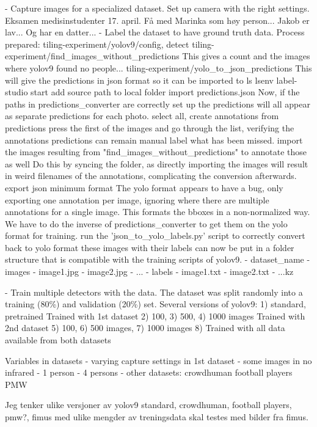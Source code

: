 - Capture images for a specialized dataset.
	Set up camera with the right settings.
	Eksamen medisinstudenter 17. april.
		Få med Marinka som høy person...
		Jakob er lav... Og har en datter...
- Label the dataset to have ground truth data.
	Process prepared: 
		tiling-experiment/yolov9/config, detect
		tiling-experiment/find_images_without_predictions
			This gives a count and the images where yolov9 found no people...
		tiling-experiment/yolo_to_json_predictions
			This will give the predictions in json format so it can be imported to ls
		lsenv
		label-studio start
		add source path to local folder
		import predictions.json
			Now, if the paths in predictions_converter are correctly set up the predictions will all appear as separate predictions for each photo.
		select all, create annotations from predictions
		press the first of the images and go through the list, verifying the annotations
			predictions can remain
		manual label what has been missed.
		import the images resulting from "find_images_without_predictions" to annotate those as well
			Do this by syncing the folder, as directly importing the images will result in weird filenames of the annotations, complicating the conversion afterwards.
		export json minimum format
			The yolo format appears to have a bug, only exporting one annotation per image, ignoring where there are multiple annotations for a single image.
			This formats the bboxes in a non-normalized way. We have to do the inverse of predictions_converter to get them on the yolo format for training.
		run the 'json_to_yolo_labels.py' script to correctly convert back to yolo format 
		these images with their labels can now be put in a folder structure that is compatible with the training scripts of yolov9.
		- {dataset_name}
			- images
				- {image1.jpg}
				- {image2.jpg}
				- ...
			- labels
				- {image1.txt}
				- {image2.txt}
				- ...kz

- Train multiple detectors with the data.
	The dataset was split randomly into a training (80\%) and validation (20\%) set.
	Several versions of yolov9:
		1) standard, pretrained
		Trained with 1st dataset
			2) 100, 3) 500, 4) 1000 images
		Trained with 2nd dataset
			5) 100, 6) 500 images, 7) 1000 images
		8) Trained with all data available from both datasets

Variables in datasets
	- varying capture settings in 1st dataset
	- some images in no infrared
	- 1 person
	- 4 persons
	- other datasets: 
		crowdhuman 
		football players
		PMW

Jeg tenker ulike versjoner av yolov9 standard, crowdhuman, football players, pmw?, fimus
med ulike mengder av treningsdata skal testes med bilder fra fimus.

